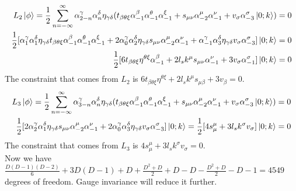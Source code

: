 \documentclass[12pt]{article}
\begin{document}
\begin{equation}
\begin{aligned}[t]
L_2\ket{\phi}=\frac{1}{2}\sum\limits_{n=-\infty}^\infty \alpha_{2-n}^\gamma\alpha_n^\delta\eta_{\gamma\delta}(t_{\beta\theta\xi}\alpha_{-1}^\beta\alpha_{-1}^\theta\alpha_{-1}^\xi+s_{\mu\nu}\alpha_{-2}^\mu\alpha_{-1}^\nu+v_\sigma\alpha_{-3}^\sigma\ket{0;k})=0\\
\frac{1}{2}[\alpha_{1}^\gamma\alpha_1^\delta\eta_{\gamma\delta}t_{\beta\theta\xi}\alpha_{-1}^\beta\alpha_{-1}^\theta\alpha_{-1}^\xi+2\alpha_{0}^\gamma\alpha_2^\delta\eta_{\gamma\delta}s_{\mu\nu}\alpha_{-2}^\mu\alpha_{-1}^\nu+\alpha_{-1}^\gamma\alpha_3^\delta\eta_{\gamma\delta}v_\sigma\alpha_{-3}^\sigma]\ket{0;k}=0\\
\frac{1}{2}[6t_{\beta\theta\xi}\eta^{\theta\xi}\alpha_{-1}^\beta+2l_s k^\mu s_{\mu\nu}\alpha_{-1}^\nu+3v_\sigma\alpha_{-1}^\sigma]\ket{0;k}=0
\end{aligned}
\end{equation}
The constraint that comes from $L_2$ is $6t_{\beta\theta\xi}\eta^{\theta\xi}+2l_s k^\mu s_{\mu\beta}+3v_\beta=0$.
\begin{equation}
\begin{aligned}[t]
L_3\ket{\phi}=\frac{1}{2}\sum\limits_{n=-\infty}^\infty \alpha_{3-n}^\gamma\alpha_n^\delta\eta_{\gamma\delta}(t_{\beta\theta\xi}\alpha_{-1}^\beta\alpha_{-1}^\theta\alpha_{-1}^\xi+s_{\mu\nu}\alpha_{-2}^\mu\alpha_{-1}^\nu+v_\sigma\alpha_{-3}^\sigma\ket{0;k})=0\\
\frac{1}{2}[2\alpha_{2}^\gamma\alpha_1^\delta\eta_{\gamma\delta}s_{\mu\nu}\alpha_{-2}^\mu\alpha_{-1}^\nu+2\alpha_{0}^\gamma\alpha_3^\delta\eta_{\gamma\delta}v_\sigma\alpha_{-3}^\sigma]\ket{0;k}=\frac{1}{2}[4s_{\mu}^\mu+3l_s k^\sigma v_\sigma]\ket{0;k}=0
\end{aligned}
\end{equation}
The constraint that comes from $L_3$ is $4s_{\mu}^\mu+3l_s k^\sigma v_\sigma=0$.\\

Now we have $\frac{D(D-1)(D-2)}{6}+3D(D-1)+D+\frac{D^2+D}{2}+D-D-\frac{D^2+D}{2}-D-1=4549$ degrees of freedom. Gauge invariance will reduce it further.
\end{document}
